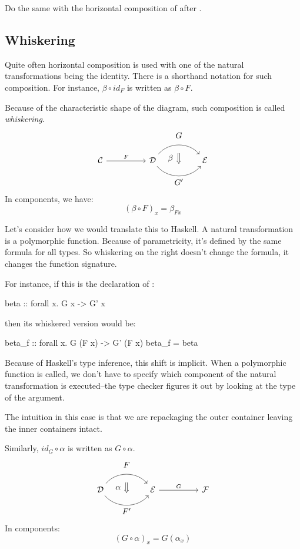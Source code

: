 \documentclass[DaoFP]{subfiles}
\begin{document}
\begin{exercise}
Do the same with the horizontal composition of  after . 
\end{exercise}

\subsection{Whiskering}

Quite often horizontal composition is used with one of the natural transformations being the identity. There is a shorthand notation for such composition. For instance, $\beta \circ id_F$ is written as $\beta \circ F$. 

Because of the characteristic shape of the diagram, such composition is called \emph{whiskering}.
\[
\begin{tikzcd}[column sep=huge]
\mathcal{C}
 \arrow[r, "F"]
 &
\mathcal{D}
  \arrow[bend left=50]{r}[name=U1, label=above:$G$]{}
  \arrow[bend right=50]{r}[name=D1, label=below:$G'$]{} 
 &
\mathcal{E}
  \arrow[shorten <=10pt,shorten >=10pt,Rightarrow,to path={(U1) -- node[label=left:$\beta$] {} (D1)}]{}
\end{tikzcd}
\]
In components, we have:
\[ (\beta \circ F)_x = \beta_{F x} \]

Let's consider how we would translate this to Haskell. A natural transformation is a polymorphic function. Because of parametricity, it's defined by the same formula for all types. So whiskering on the right doesn't change the formula, it changes the function signature. 

For instance, if this is the declaration of :
\begin{haskell}
beta :: forall x. G x -> G' x
\end{haskell}
then its whiskered version would be:
\begin{haskell}
beta_f :: forall x. G (F x) -> G' (F x)
beta_f = beta
\end{haskell}
Because of Haskell's type inference, this shift is implicit. When a polymorphic function is called, we don't have to specify which component of the natural transformation is executed--the type checker figures it out by looking at the type of the argument. 

The intuition in this case is that we are repackaging the outer container leaving the inner containers intact.

Similarly, $id_G \circ \alpha$ is written as $G \circ \alpha$.
\[
\begin{tikzcd}[column sep=huge]
\mathcal{D}
  \arrow[bend left=50]{r}[name=U, label=above:$F$]{}
  \arrow[bend right=50]{r}[name=D, label=below:$F'$]{} 
 &
\mathcal{E}
\arrow[r, "G"]
&
\mathcal{F}
  \arrow[shorten <=10pt,shorten >=10pt,Rightarrow,to path={(U) -- node[label=left:$\alpha$] {} (D)}]{}
\end{tikzcd}
\]
In components:
\[(G \circ \alpha)_x = G (\alpha_x) \]
\end{document}
